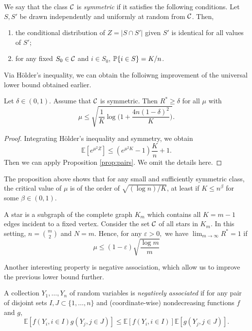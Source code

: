 \documentclass[10pt, oneside]{article}
\begin{document}
\begin{defn}
  We say that the class ${\mathcal C}$ is {\it symmetric} if it satisfies the following conditions.
  Let $S,S'$ be drawn independently and uniformly at random from ${\mathcal C}$. Then,
  \begin{enumerate}
    \item the conditional distribution of $Z=|S\cap S'|$ given $S'$ is identical
    for all values of $S'$;
    \item for any fixed $S_0\in{\mathcal C}$ and $i\in S_0$, $\mathbb{P}\{i\in S\}=K/n$.
  \end{enumerate}
\end{defn}
Via H\"older's inequality, we can obtain the folloiwng improvement of the universal lower bound obtained earlier.
\begin{prop}
  \label{symmetric}
  Let $\delta\in(0,1)$.
  Assume that ${\mathcal C}$ is symmetric. Then $R^*\ge\delta$ for all $\mu$ with
  \[
  \mu\le\sqrt{\frac{1}{K}\log\biggl(1+\frac{4n(1-\delta)^2}{K} \biggr)}.
  \]
\end{prop}
\begin{proof}
  Integrating H\"older's inequality and symmetry, we obtain 
  $$\mathbb{E}[ e^{\mu^2 Z}]\le (e^{\mu^2K} -1 ) \frac{K}{n} +1.$$
  Then we can apply Proposition \ref{prop:pairs}. We omit the details here.
\end{proof}
The proposition above shows that for any small and sufficiently symmetric
class, the critical value of $\mu$ is of the order of
$\sqrt{(\log n)/K}$, at least if $K\le n^\beta$ for some $\beta\in(0,1)$.
\begin{exmp}
A star is a subgraph of the complete graph $K_m$ which contains all $K=m-1$ edges incident to a fixed vertex. Consider the set ${\mathcal C}$ of all stars in $K_m$. In this setting, $n={m\choose2}$ and $N=m$. Hence, 
for any $\varepsilon>0,$ we have $\lim_{m\to\infty} R^* = 1$ if 
$$\mu\le(1-\varepsilon)\sqrt{\dfrac{\log m}{m}}$$
\end{exmp}
Another interesting property is negative association, which allow us to improve the previous lower bound further.
\begin{defn}
  A collection $Y_1,\ldots,Y_n$ of random variables is \textit{negatively associated} if for any pair of disjoint sets $I,J\subset\{1,\ldots,n\}$ and (coordinate-wise) nondecreasing functions $f$ and $g$,
\[
\mathbb{E}[ f(Y_i, i\in I) g(Y_j, j\in J) ]
\le\mathbb{E}[ f(Y_i, i\in I) ] \mathbb{E}[g(Y_j, j\in J) ].
\]
\end{defn}
\end{document}

